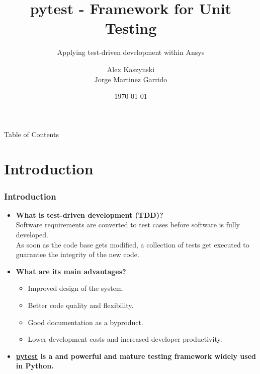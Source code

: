 \documentclass[t]{beamer}
\begin{document}

\title{pytest - Framework for Unit Testing}
\subtitle{\small Applying test-driven development within Ansys}
\author{Alex Kaszynski \\ Jorge Martinez Garrido}
\date{\today}

\titleframe{}



\begin{frame}{Table of Contents}
  \tableofcontents
  \vspace{200pt}  %
\end{frame}


\section{Introduction}

\begin{frame}[fragile=singleslide]
  \frametitle{Introduction}

  \vspace{-15pt}

  \begin{itemize}
  \setlength\itemsep{1em}

  \item{\textbf{What is test-driven development (TDD)?}
    \\Software requirements are converted to test cases before software is
    fully developed.
    \\As soon as the code base gets modified, a collection of tests get executed
    to guarantee the integrity of the new code.
  }

  \item{\textbf{What are its main advantages?}
    \begin{itemize}
    \item \small Improved design of the system.
    \item \small Better code quality and flexibility.
    \item \small Good documentation as a byproduct.
    \item \small Lower development costs and increased developer productivity.
    \end{itemize}
  }
  
  \vspace{-3pt}
  \item {\textbf{\href{https://pytest.org/}{pytest} is a and powerful and mature testing framework widely used in Python.}
    }

  \end{itemize}

\end{frame}
\end{document}
